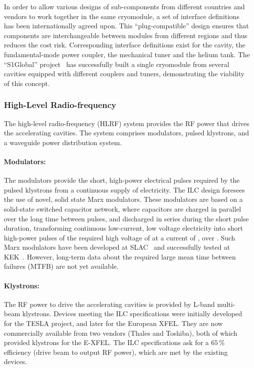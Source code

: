 In order to allow various designs of sub-components from different countries and vendors to work together in the same cryomodule, a set of interface definitions has been internationally agreed upon.
This ``plug-compatible'' design ensures that components are interchangeable between modules from different regions and thus reduces the cost risk.
Corresponding interface definitions exist for the cavity, the fundamental-mode power coupler, the mechanical tuner and the helium tank.
The ``S1Global'' project~\cite{bib:s1g} has successfully built a single cryomodule from several cavities equipped with different couplers and tuners, demonstrating the viability of this concept.


\subsubsection{High-Level Radio-frequency}

The high-level radio-frequency (HLRF) system provides the RF power that drives the accelerating cavities.
The system comprises modulators, pulsed klystrons, and a waveguide power distribution system.


\paragraph{Modulators:}
The modulators provide the short, high-power electrical pulses required by the pulsed klystrons from a continuous supply of electricity. 
The ILC design foresees the use of novel, solid state Marx modulators.
These modulators are based on a solid-state switched capacitor network, where capacitors are charged in parallel over the long time between pulses, and discharged in series during the short pulse duration,
transforming continuous low-current, low voltage electricity into short high-power pulses of the required high voltage of  at a current of , over .
Such Marx modulators have been developed at SLAC~\cite{Kemp:2011zz} 
and successfully tested at KEK~\cite{Gaudreau:2014pza}.
However, long-term data about the required large mean time between failures (MTFB) are not yet available.

\paragraph{Klystrons:}
The RF power to drive the accelerating cavities is provided by  L-band multi-beam klystrons. 
Devices meeting the ILC specifications were initially developed for the TESLA project, and later for the European XFEL.
They are now commercially available from two vendors (Thales and Toshiba), both of which provided klystrons for the E-XFEL.
The ILC specifications ask for a $65\,\%$ efficiency (drive beam to output RF power), which are met by the existing devices.

